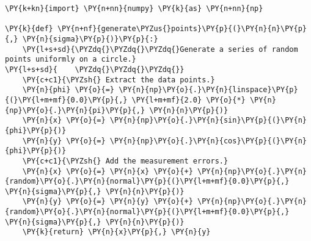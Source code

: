 \begin{Verbatim}[label=\makebox{\href{https://bitbucket.org/lbaldini/statnotes/src/master/snippets/fit\_circle.py}{https://bitbucket.org/.../fit\_circle.py}},commandchars=\\\{\}]
\PY{k+kn}{import} \PY{n+nn}{numpy} \PY{k}{as} \PY{n+nn}{np}

\PY{k}{def} \PY{n+nf}{generate\PYZus{}points}\PY{p}{(}\PY{n}{n}\PY{p}{,} \PY{n}{sigma}\PY{p}{)}\PY{p}{:}
    \PY{l+s+sd}{\PYZdq{}\PYZdq{}\PYZdq{}Generate a series of random points uniformly on a circle.}
\PY{l+s+sd}{    \PYZdq{}\PYZdq{}\PYZdq{}}
    \PY{c+c1}{\PYZsh{} Extract the data points.}
    \PY{n}{phi} \PY{o}{=} \PY{n}{np}\PY{o}{.}\PY{n}{linspace}\PY{p}{(}\PY{l+m+mf}{0.0}\PY{p}{,} \PY{l+m+mf}{2.0} \PY{o}{*} \PY{n}{np}\PY{o}{.}\PY{n}{pi}\PY{p}{,} \PY{n}{n}\PY{p}{)}
    \PY{n}{x} \PY{o}{=} \PY{n}{np}\PY{o}{.}\PY{n}{sin}\PY{p}{(}\PY{n}{phi}\PY{p}{)}
    \PY{n}{y} \PY{o}{=} \PY{n}{np}\PY{o}{.}\PY{n}{cos}\PY{p}{(}\PY{n}{phi}\PY{p}{)}
    \PY{c+c1}{\PYZsh{} Add the measurement errors.}
    \PY{n}{x} \PY{o}{=} \PY{n}{x} \PY{o}{+} \PY{n}{np}\PY{o}{.}\PY{n}{random}\PY{o}{.}\PY{n}{normal}\PY{p}{(}\PY{l+m+mf}{0.0}\PY{p}{,} \PY{n}{sigma}\PY{p}{,} \PY{n}{n}\PY{p}{)}
    \PY{n}{y} \PY{o}{=} \PY{n}{y} \PY{o}{+} \PY{n}{np}\PY{o}{.}\PY{n}{random}\PY{o}{.}\PY{n}{normal}\PY{p}{(}\PY{l+m+mf}{0.0}\PY{p}{,} \PY{n}{sigma}\PY{p}{,} \PY{n}{n}\PY{p}{)}
    \PY{k}{return} \PY{n}{x}\PY{p}{,} \PY{n}{y}


\end{Verbatim}
